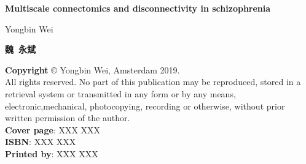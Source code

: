 \documentclass[10pt,twoside,b5paper,final]{book}
\def\maintitle{Multiscale connectomics and disconnectivity in schizophrenia}
\def\authors{Yongbin Wei}
\def\locationdate{Amsterdam, 22-11-2019}
\begin{document}
\selectfont	

\frontmatter
\pagestyle{empty}

\begin{center}
  \vspace*{3cm}
  {\LARGE\bfseries\maintitle\par}
  \vspace{6em}%
  {\Large\authors\par}
  \vspace{3mm}%
  \begin{CJK*}{UTF8}{gbsn}
  \textbf{魏\ 永斌}
  \clearpage\end{CJK*} 
\end{center}

\newpage
\vspace*{\fill}
\begin{flushleft}
\vspace{0.1cm}
\textbf{Copyright} © Yongbin Wei, Amsterdam 2019. \\
\vspace{0.1cm}
All rights reserved.   No part of this publication may be reproduced, stored in a retrieval system or transmitted in any form or by any means, electronic,mechanical,  photocopying,  recording  or  otherwise,  without  prior  written permission of the author.\\
\vspace{0.1cm}
\textbf{Cover page}: XXX XXX \\ %
\vspace{0.1cm}
\textbf{ISBN}: XXX XXX \\%
\vspace{0.1cm}
\textbf{Printed by}: XXX XXX \\%
\end{flushleft}

\newpage
\end{document}
